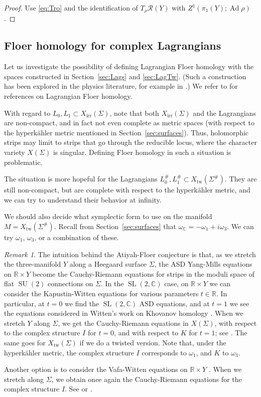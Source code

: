 \documentclass [11pt]{amsart}
\theoremstyle{remark}
\newtheorem {remark}[theorem]{Remark}
\def\rr {{\mathbb{R}}}
\def\cc {{\mathbb{C}}}
\def\C{\cc}
\def\R{\rr}
\def\sl {{\operatorname{SL}(2, \cc)}}
\def\su {{\operatorname{SU}(2)}}
\def\Rs {\mathscr{R}}
\def\Ad {\operatorname{Ad}}
\def\Char {X}
\def\CharIrr {\Char_{\operatorname{irr}}}
\def\Xtw{\Char_{\operatorname{tw}}}
\def\omegac{\omega_{\C}}
\begin{document}
\begin{proof}
Use \eqref{eq:Tro} and the identification of $T_{\rho}\Rs(Y)$ with $Z^1(\pi_1(Y); \Ad \rho)$.
\end{proof}

\subsection{Floer homology for complex Lagrangians}
\label{sec:ComplexLag}
Let us investigate the possibility of defining Lagrangian Floer homology with the spaces constructed in Section~\ref{sec:Lags} and \ref{sec:LagTw}. (Such a construction has been explored in the physics literature, for example in \cite{GukovSO}.) We refer to \cite{FloerLagrangian, FOOO, SeidelBook, OhBook, AurouxSurvey} for references on Lagrangian Floer homology.

With regard to $L_0, L_1 \subset \CharIrr(\Sigma)$, note that both $\CharIrr(\Sigma)$ and the Lagrangians are non-compact, and in fact not even complete as metric spaces (with respect to the hyperk\"ahler metric mentioned in Section~\ref{sec:surfaces}). Thus, holomorphic strips may limit to strips that go through the reducible locus, where the character variety $\Char(\Sigma)$ is singular. Defining Floer homology in such a situation is problematic.

The situation is more hopeful for the Lagrangians $L^{\#}_0, L^{\#}_1 \subset \Xtw(\Sigma^{\#})$. They are still non-compact, but are complete with respect to the hyperk\"ahler metric, and we can try to understand their behavior at infinity.

We should also decide what symplectic form to use on the manifold $M=\Xtw(\Sigma^{\#})$. Recall from Section~\ref{sec:surfaces} that $\omegac = -\omega_1 + i \omega_3$. We can try  $\omega_1$, $\omega_3$, or a combination of these. 

\begin{remark}
The intuition behind the Atiyah-Floer conjecture is that, as we stretch the three-manifold $Y$ along a Heegaard surface $\Sigma$, the ASD Yang-Mills equations on $\R \times Y$ become the Cauchy-Riemann equations for strips in the moduli space of flat $\su$ connections on $\Sigma$. In the $\sl$ case, on $\R \times Y$ we can consider the Kapustin-Witten equations \cite{KapustinWitten} for various parameters $t \in \R$. In particular, at $t=0$ we find the $\sl$ ASD equations, and at $t=1$ we see the equations considered in Witten's work on Khovanov homology \cite{FiveBranes}. When we stretch $Y$ along $\Sigma$, we get the Cauchy-Riemann equations in $\Char(\Sigma)$, with respect to the complex structure $I$ for $t=0$, and with respect to $K$ for $t=1$; see \cite[Section 4]{KapustinWitten}. The same goes for $\Xtw(\Sigma)$ if we do a twisted version. Note that, under the hyperk\"ahler metric, the complex structure $I$ corresponds to $\omega_1$, and $K$ to $\omega_3$.

Another option is to consider the Vafa-Witten equations on $\R \times Y$ \cite{VafaWitten}. When we stretch along $\Sigma$, we obtain once again the Cauchy-Riemann equations for the complex structure $I$. See \cite[Section 4.2]{Haydys} or \cite[Section 8]{Mares}.
\end{remark}
\end{document}
